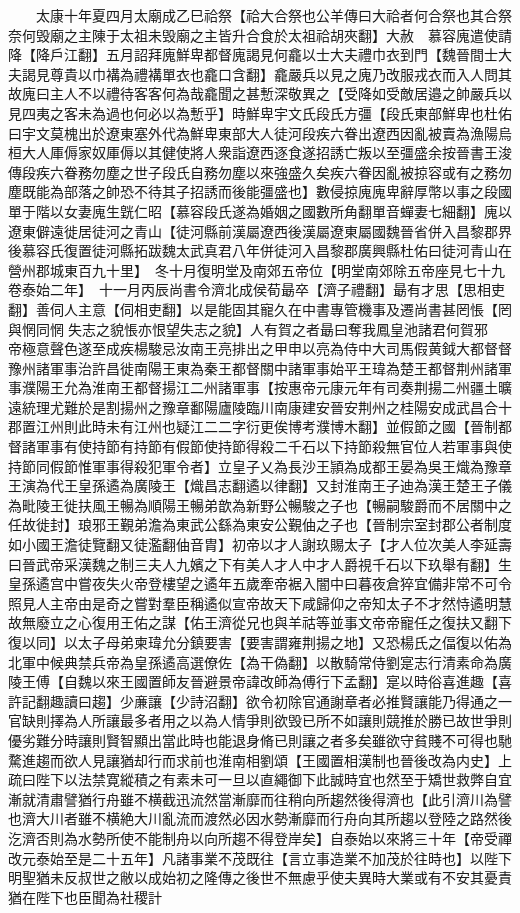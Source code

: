 　　太康十年夏四月太廟成乙巳祫祭【祫大合祭也公羊傳曰大祫者何合祭也其合祭奈何毁廟之主陳于太祖未毁廟之主皆升合食於太祖祫胡夾翻】大赦　慕容廆遣使請降【降戶江翻】五月詔拜廆鮮卑都督廆謁見何龕以士大夫禮巾衣到門【魏晉間士大夫謁見尊貴以巾褠為禮褠單衣也龕口含翻】龕嚴兵以見之廆乃改服戎衣而入人問其故廆曰主人不以禮待客客何為哉龕聞之甚慙深敬異之【受降如受敵居邉之帥嚴兵以見四夷之客未為過也何必以為慙乎】時鮮卑宇文氏段氏方彊【段氏東部鮮卑也杜佑曰宇文莫槐出於遼東塞外代為鮮卑東部大人徒河段疾六眷出遼西因亂被賣為漁陽烏桓大人厙傉家奴厙傉以其健使將人衆詣遼西逐食遂招誘亡叛以至彊盛余按晉書王浚傳段疾六眷務勿塵之世子段氏自務勿塵以來強盛久矣疾六眷因亂被掠容或有之務勿塵既能為部落之帥恐不待其子招誘而後能彊盛也】數侵掠廆廆卑辭厚幣以事之段國單于階以女妻廆生皝仁昭【慕容段氏遂為婚姻之國數所角翻單音蟬妻七細翻】廆以遼東僻遠徙居徒河之青山【徒河縣前漢屬遼西後漢屬遼東屬國魏晉省併入昌黎郡界後慕容氏復置徒河縣拓跋魏太武真君八年併徒河入昌黎郡廣興縣杜佑曰徒河青山在營州郡城東百九十里】　冬十月復明堂及南郊五帝位【明堂南郊除五帝座見七十九卷泰始二年】　十一月丙辰尚書令濟北成侯荀朂卒【濟子禮翻】朂有才思【思相吏翻】善伺人主意【伺相吏翻】以是能固其寵久在中書專管機事及遷尚書甚罔悵【罔與惘同惘失志之貌悵亦恨望失志之貌】人有賀之者朂曰奪我鳳皇池諸君何賀邪　帝極意聲色遂至成疾楊駿忌汝南王亮排出之甲申以亮為侍中大司馬假黄鉞大都督督豫州諸軍事治許昌徙南陽王東為秦王都督關中諸軍事始平王瑋為楚王都督荆州諸軍事濮陽王允為淮南王都督揚江二州諸軍事【按惠帝元康元年有司奏荆揚二州疆土曠遠統理尤難於是割揚州之豫章鄱陽廬陵臨川南康建安晉安荆州之桂陽安成武昌合十郡置江州則此時未有江州也疑江二二字衍更俟博考濮博木翻】並假節之國【晉制都督諸軍事有使持節有持節有假節使持節得殺二千石以下持節殺無官位人若軍事與使持節同假節惟軍事得殺犯軍令者】立皇子乂為長沙王頴為成都王晏為吳王熾為豫章王演為代王皇孫遹為廣陵王【熾昌志翻遹以律翻】又封淮南王子迪為漢王楚王子儀為毗陵王徙扶風王暢為順陽王暢弟歆為新野公暢駿之子也【暢嗣駿爵而不居關中之任故徙封】琅邪王覲弟澹為東武公繇為東安公覲伷之子也【晉制宗室封郡公者制度如小國王澹徒覽翻又徒濫翻伷音胄】初帝以才人謝玖賜太子【才人位次美人李延壽曰晉武帝采漢魏之制三夫人九嬪之下有美人才人中才人爵視千石以下玖舉有翻】生皇孫遹宫中嘗夜失火帝登樓望之遹年五歲牽帝裾入闇中曰暮夜倉猝宜備非常不可令照見人主帝由是奇之嘗對羣臣稱遹似宣帝故天下咸歸仰之帝知太子不才然恃遹明慧故無廢立之心復用王佑之謀【佑王濟從兄也與羊祜等並事文帝帝寵任之復扶又翻下復以同】以太子母弟柬瑋允分鎮要害【要害謂雍荆揚之地】又恐楊氏之偪復以佑為北軍中候典禁兵帝為皇孫遹高選僚佐【為干偽翻】以散騎常侍劉寔志行清素命為廣陵王傅【自魏以來王國置師友晉避景帝諱改師為傅行下孟翻】寔以時俗喜進趣【喜許記翻趣讀曰趨】少亷讓【少詩沼翻】欲令初除官通謝章者必推賢讓能乃得通之一官缺則擇為人所讓最多者用之以為人情爭則欲毁已所不如讓則競推於勝已故世爭則優劣難分時讓則賢智顯出當此時也能退身脩已則讓之者多矣雖欲守貧賤不可得也馳騖進趨而欲人見讓猶却行而求前也淮南相劉頌【王國置相漢制也晉後改為内史】上疏曰陛下以法禁寛縱積之有素未可一旦以直繩御下此誠時宜也然至于矯世救弊自宜漸就清肅譬猶行舟雖不横截迅流然當漸靡而往稍向所趨然後得濟也【此引濟川為譬也濟大川者雖不横絶大川亂流而渡然必因水勢漸靡而行舟向其所趨以登陸之路然後汔濟否則為水勢所使不能制舟以向所趨不得登岸矣】自泰始以來將三十年【帝受禪改元泰始至是二十五年】凡諸事業不茂既往【言立事造業不加茂於往時也】以陛下明聖猶未反叔世之敝以成始初之隆傳之後世不無慮乎使夫異時大業或有不安其憂責猶在陛下也臣聞為社稷計